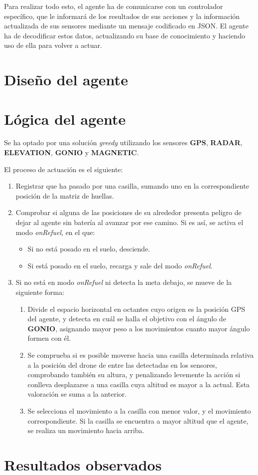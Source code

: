 \documentclass[11pt,a4paper]{article}
\begin{document}
Para realizar todo esto, el agente ha de comunicarse con un controlador específico, que le informará de los resultados de sus acciones y la información actualizada
de sus sensores mediante un mensaje codificado en JSON. El agente ha de decodificar estos datos, actualizando su base de conocimiento y haciendo uso de ella para 
volver a actuar.

\section{Diseño del agente}



\section{Lógica del agente}

Se ha optado por una solución \textit{greedy} utilizando los sensores \textbf{GPS}, \textbf{RADAR}, \textbf{ELEVATION}, \textbf{GONIO} y \textbf{MAGNETIC}.

El proceso de actuación es el siguiente:

\begin{enumerate}
	\item Registrar que ha pasado por una casilla, sumando uno en la correspondiente posición de la matriz de huellas.
	\item Comprobar si alguna de las posiciones de su alrededor presenta peligro de dejar al agente sin batería al avanzar por ese camino. Si es así, se activa el modo \textit{onRefuel}, en el que:
	
	\begin{itemize}
		\item Si no está posado en el suelo, desciende.
		\item Si está posado en el suelo, recarga y sale del modo \textit{onRefuel}.
	\end{itemize}
	
	\item Si no está en modo \textit{onRefuel}  ni detecta la meta debajo, se mueve de la siguiente forma:
	\begin{enumerate}
		\item Divide el espacio horizontal en octantes cuyo origen es la posición GPS del agente, y detecta en cuál se halla el objetivo con el ángulo de \textbf{GONIO}, asignando mayor peso a los movimientos cuanto mayor ángulo formen con él.
		\item Se comprueba si es posible moverse hacia una casilla determinada relativa a la posición del drone de entre las detectadas en los sensores, comprobando también su altura, y penalizando levemente la acción si conlleva desplazarse a una casilla cuya altitud es mayor a la actual. Esta valoración se suma a la anterior.
		\item Se selecciona el movimiento a la casilla con menor valor, y el movimiento correspondiente. Si la casilla se encuentra a mayor altitud que el agente, se realiza un movimiento hacia arriba.
	\end{enumerate}
\end{enumerate}

\section{Resultados observados}
\end{document}
